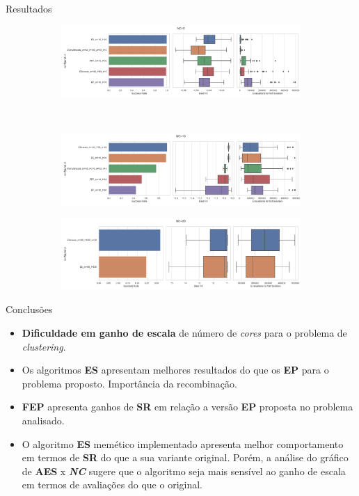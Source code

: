 \documentclass[pdf]{beamer}
\begin{document}
\begin{frame}{Resultados}
	\begin{figure}
		\begin{subfigure}[t]{\textwidth}
			\centering
			\includegraphics[scale=0.23]{img/NC=5.png}
		\end{subfigure}\
		\begin{subfigure}[t]{\textwidth}
			\centering
			\includegraphics[scale=0.23]{img/NC=10.png}
		\end{subfigure}
		\begin{subfigure}[t]{\textwidth}
			\centering
			\includegraphics[scale=0.22]{img/NC=20.png}
		\end{subfigure}
	\end{figure}
\end{frame}


\begin{frame}{Conclusões}
	\begin{itemize}
		\item \textbf{Dificuldade em ganho de escala} de número de \textit{cores} para o problema de \textit{clustering}.
		\item Os algoritmos \textbf{ES} apresentam melhores resultados do que os \textbf{EP} para o problema proposto. Importância da recombinação.
		\item \textbf{FEP} apresenta ganhos de \textbf{SR} em relação a versão \textbf{EP} proposta no problema analisado.
		\item O algoritmo \textbf{ES} memético implementado apresenta melhor comportamento em termos de \textbf{SR} do que a sua variante original. Porém, a análise do gráfico de \textbf{AES} x \textbf{\textit{NC}} sugere que o algoritmo seja mais sensível ao ganho de escala em termos de avaliações do que o original. 

	\end{itemize}
\end{frame}
\end{document}
